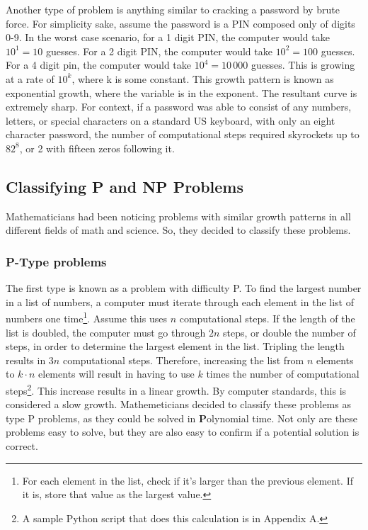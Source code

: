\documentclass[10pt,journal,compsoc]{IEEEtran}
\begin{document}
Another type of problem is anything similar to cracking a password by brute force. For simplicity sake, assume the password is a PIN composed only of digits 0-9. In the worst case scenario, for a 1 digit PIN, the computer would take $10^1=10$ guesses. For a 2 digit PIN, the computer would take $10^2 = 100$ guesses. For a 4 digit pin, the computer would take $10^4=10\,000$ guesses. This is growing at a rate of $10^k$, where k is some constant. This growth pattern is known as exponential growth, where the variable is in the exponent. The resultant curve is extremely sharp. For context, if a password was able to consist of any numbers, letters, or special characters on a standard US keyboard, with only an eight character password, the number of computational steps required skyrockets up to $82^8$, or 2 with fifteen zeros following it. 

\subsection{Classifying P and NP Problems}
Mathematicians had been noticing problems with similar growth patterns in all different fields of math and science. So, they decided to classify these problems.

\subsubsection{P-Type problems} The first type is known as a problem with difficulty P. To find the largest number in a list of numbers, a computer must iterate through each element in the list of numbers one time\footnote{For each element in the list, check if it's larger than the previous element. If it is, store that value as the largest value.}. Assume this uses $n$ computational steps. If the length of the list is doubled, the computer must go through $2n$ steps, or double the number of steps, in order to determine the largest element in the list. Tripling the length results in $3n$ computational steps. Therefore, increasing the list from $n$ elements to $k\cdot n $ elements will result in having to use $k$ times the number of computational steps\footnote{A sample Python script that does this calculation is in Appendix A.}. This increase results in a linear growth. By computer standards, this is considered a slow growth. Mathemeticians decided to classify these problems as type P problems, as they could be solved in  \textbf{P}olynomial time. Not only are these problems easy to solve, but they are also easy to confirm if a potential solution is correct. 
\end{document}
